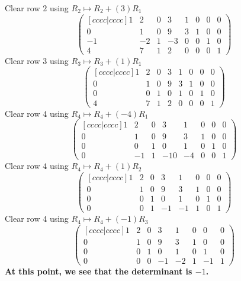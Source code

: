 \documentclass{article}
\begin{document}
Clear row \(2\) using \(R_2\mapsto R_2+(3)R_1\)\[\begin{pmatrix}[ c c
c c | c c c c ] 1 & 2 & 0 & 3 & 1 & 0 & 0 & 0 \\ 0 & 1 & 0 & 9 & 3 & 1
& 0 & 0 \\ -1 & -2 & 1 & -3 & 0 & 0 & 1 & 0 \\ 4 & 7 & 1 & 2 & 0 & 0 &
0 & 1 \end{pmatrix}\]Clear row \(3\) using \(R_3\mapsto
R_3+(1)R_1\)\[\begin{pmatrix}[ c c c c | c c c c ] 1 & 2 & 0 & 3 & 1 &
0 & 0 & 0 \\ 0 & 1 & 0 & 9 & 3 & 1 & 0 & 0 \\ 0 & 0 & 1 & 0 & 1 & 0 &
1 & 0 \\ 4 & 7 & 1 & 2 & 0 & 0 & 0 & 1 \end{pmatrix}\]Clear row \(4\)
using \(R_4\mapsto R_4+(-4)R_1\)\[\begin{pmatrix}[ c c c c | c c c c ]
1 & 2 & 0 & 3 & 1 & 0 & 0 & 0 \\ 0 & 1 & 0 & 9 & 3 & 1 & 0 & 0 \\ 0 &
0 & 1 & 0 & 1 & 0 & 1 & 0 \\ 0 & -1 & 1 & -10 & -4 & 0 & 0 & 1
\end{pmatrix}\]Clear row \(4\) using \(R_4\mapsto
R_4+(1)R_2\)\[\begin{pmatrix}[ c c c c | c c c c ] 1 & 2 & 0 & 3 & 1 &
0 & 0 & 0 \\ 0 & 1 & 0 & 9 & 3 & 1 & 0 & 0 \\ 0 & 0 & 1 & 0 & 1 & 0 &
1 & 0 \\ 0 & 0 & 1 & -1 & -1 & 1 & 0 & 1 \end{pmatrix}\]Clear row
\(4\) using \(R_4\mapsto R_4+(-1)R_3\)\[\begin{pmatrix}[ c c c c | c c
c c ] 1 & 2 & 0 & 3 & 1 & 0 & 0 & 0 \\ 0 & 1 & 0 & 9 & 3 & 1 & 0 & 0
\\ 0 & 0 & 1 & 0 & 1 & 0 & 1 & 0 \\ 0 & 0 & 0 & -1 & -2 & 1 & -1 & 1
\end{pmatrix}\]
{\bf At this point, we see that the determinant is \(-1\).}
\end{document}
